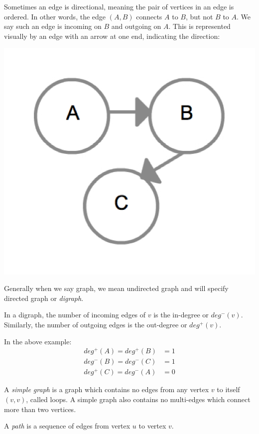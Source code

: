 Sometimes an edge is directional, meaning the pair of vertices in an
edge is ordered.  In other words, the edge $(A, B)$ connects $A$ to
$B$, but not $B$ to $A$.  We say such an edge is incoming on $B$ and
outgoing on $A$.  This is represented visually by an edge with an
arrow at one end, indicating the direction:

{
  \includegraphics[scale=0.2]{DiGraph}
  \label{fig:DiGraph}
}

Generally when we say graph, we mean undirected graph and will specify
directed graph or \emph{digraph}.

In a digraph, the number of incoming edges of $v$ is the in-degree or
$deg^-(v)$.  Similarly, the number of outgoing edges is the
out-degree or $deg^+(v)$.

In the above example:
%
\begin{align*}
deg^+(A) = deg^+(B) &= 1 \\
deg^-(B) = deg^-(C) &= 1 \\
deg^+(C) = deg^-(A) &= 0
\end{align*}

A \emph{simple graph} is a graph which contains no edges from any
vertex $v$ to itself $ (v,v) $, called loops.  A simple graph also
contains no multi-edges which connect more than two vertices.

A \emph{path} is a sequence of edges from vertex $u$ to vertex $v$.

